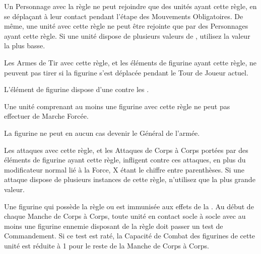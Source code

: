 Un Personnage avec la règle \randommovement{} ne peut rejoindre que des unités ayant cette règle, en se déplaçant à leur contact pendant l'étape des Mouvements Obligatoires. De même, une unité avec cette règle ne peut être rejointe que par des Personnages ayant cette règle. Si une unité dispose de plusieurs valeurs de \randommovement{}, utilisez la valeur la plus basse.


Les Armes de Tir avec cette règle, et les éléments de figurine ayant cette règle, ne peuvent pas tirer si la figurine s'est déplacée pendant le Tour de Joueur actuel.


L'élément de figurine dispose d'une  contre les \flamingattacks{}.


Une unité comprenant au moins une figurine avec cette règle ne peut pas effectuer de Marche Forcée.


La figurine ne peut en aucun cas devenir le Général de l'armée.


Les attaques avec cette règle, et les Attaques de Corps à Corps portées par des éléments de figurine ayant cette règle, infligent  contre ces attaques, en plus du modificateur normal lié à la Force, X étant le chiffre entre parenthèses. Si une attaque dispose de plusieurs instances de cette règle, n'utilisez que la plus grande valeur.



 Une figurine qui possède la règle \immunetopsychology{} ou \fear{} est immunisée aux effets de la \fear{}. Au début de chaque Manche de Corps à Corps, toute unité en contact socle à socle avec au moins une figurine ennemie disposant de la règle \fear{} doit passer un test de Commandement. Si ce test est raté, la Capacité de Combat des figurines de cette unité est réduite à 1 pour le reste de la Manche de Corps à Corps.

